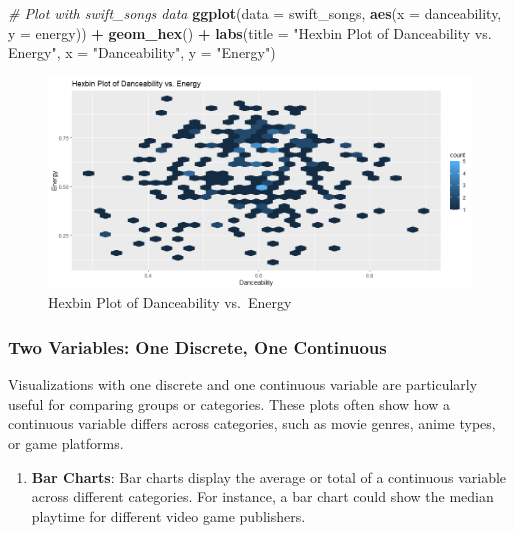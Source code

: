 \documentclass[
]{book}
\newenvironment{Shaded}{\begin{snugshade}}{\end{snugshade}}
\newcommand{\AttributeTok}[1]{\textcolor[rgb]{0.13,0.29,0.53}{#1}}
\newcommand{\CommentTok}[1]{\textcolor[rgb]{0.56,0.35,0.01}{\textit{#1}}}
\newcommand{\FunctionTok}[1]{\textcolor[rgb]{0.13,0.29,0.53}{\textbf{#1}}}
\newcommand{\NormalTok}[1]{#1}
\newcommand{\SpecialCharTok}[1]{\textcolor[rgb]{0.81,0.36,0.00}{\textbf{#1}}}
\newcommand{\StringTok}[1]{\textcolor[rgb]{0.31,0.60,0.02}{#1}}
\providecommand{\tightlist}{%
  \setlength{\itemsep}{0pt}\setlength{\parskip}{0pt}}
\begin{document}
\begin{Shaded}
\begin{Highlighting}[]
\CommentTok{\# Plot with swift\_songs data}
\FunctionTok{ggplot}\NormalTok{(}\AttributeTok{data =}\NormalTok{ swift\_songs, }\FunctionTok{aes}\NormalTok{(}\AttributeTok{x =}\NormalTok{ danceability, }\AttributeTok{y =}\NormalTok{ energy)) }\SpecialCharTok{+}
  \FunctionTok{geom\_hex}\NormalTok{() }\SpecialCharTok{+}
  \FunctionTok{labs}\NormalTok{(}\AttributeTok{title =} \StringTok{"Hexbin Plot of Danceability vs. Energy"}\NormalTok{, }\AttributeTok{x =} \StringTok{"Danceability"}\NormalTok{, }\AttributeTok{y =} \StringTok{"Energy"}\NormalTok{)}
\end{Highlighting}
\end{Shaded}

\begin{figure}
\centering
\includegraphics[width=1\textwidth,height=\textheight]{images/hexbin.png}
\caption{Hexbin Plot of Danceability vs.~Energy}
\end{figure}

\subsubsection*{Two Variables: One Discrete, One Continuous}\label{two-variables-one-discrete-one-continuous}

Visualizations with one discrete and one continuous variable are particularly useful for comparing groups or categories. These plots often show how a continuous variable differs across categories, such as movie genres, anime types, or game platforms.

\begin{enumerate}
\def\labelenumi{\arabic{enumi}.}
\tightlist
\item
  \textbf{Bar Charts}: Bar charts display the average or total of a continuous variable across different categories. For instance, a bar chart could show the median playtime for different video game publishers.
\end{enumerate}
\end{document}
